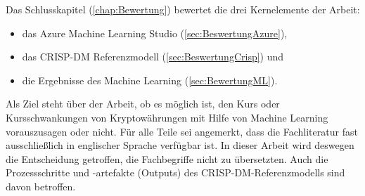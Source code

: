 Das Schlusskapitel (\ref{chap:Bewertung}) bewertet die drei Kernelemente der Arbeit:
\begin{itemize}
\item das Azure Machine Learning Studio (\ref{sec:BeswertungAzure}),
\item das CRISP-DM Referenzmodell (\ref{sec:BeswertungCrisp}) und
\item die Ergebnisse des Machine Learning (\ref{sec:BewertungML}).
\end{itemize}
Als Ziel steht über der Arbeit, ob es möglich ist, den Kurs oder Kursschwankungen von Kryptowährungen mit Hilfe von Machine Learning vorauszusagen oder nicht.\newline
Für alle Teile sei angemerkt, dass die Fachliteratur fast ausschließlich in englischer Sprache verfügbar ist. In dieser Arbeit wird deswegen die Entscheidung getroffen, die Fachbegriffe nicht zu übersetzten. Auch die Prozessschritte und -artefakte (Outputs) des CRISP-DM-Referenzmodells sind davon betroffen. 
